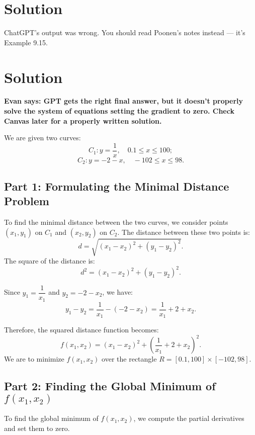 \documentclass[11pt]{article}
\begin{document}
\newpage



\newpage

\section{Solution}
ChatGPT's output was wrong.
You should read Poonen's notes instead --- it's Example 9.15.

\section{Solution}
\textbf{Evan says: GPT gets the right final answer,
but it doesn't properly solve the system of equations setting the gradient to zero.
Check Canvas later for a properly written solution.}

We are given two curves:
\[
C_1: y = \frac{1}{x}, \quad 0.1 \leq x \leq 100;
\]
\[
C_2: y = -2 - x, \quad -102 \leq x \leq 98.
\]

\subsection{Part 1: Formulating the Minimal Distance Problem}

To find the minimal distance between the two curves, we consider points \( (x_1, y_1) \) on \( C_1 \) and \( (x_2, y_2) \) on \( C_2 \). The distance between these two points is:
\[
d = \sqrt{(x_1 - x_2)^2 + (y_1 - y_2)^2}.
\]
The square of the distance is:
\[
d^2 = (x_1 - x_2)^2 + (y_1 - y_2)^2.
\]

Since \( y_1 = \dfrac{1}{x_1} \) and \( y_2 = -2 - x_2 \), we have:
\[
y_1 - y_2 = \frac{1}{x_1} - (-2 - x_2) = \frac{1}{x_1} + 2 + x_2.
\]

Therefore, the squared distance function becomes:
\[
f(x_1, x_2) = (x_1 - x_2)^2 + \left( \frac{1}{x_1} + 2 + x_2 \right)^2.
\]
We are to minimize \( f(x_1, x_2) \) over the rectangle \( R = [0.1, 100] \times [-102, 98] \).

\newpage

\subsection{Part 2: Finding the Global Minimum of \( f(x_1, x_2) \)}

To find the global minimum of \( f(x_1, x_2) \), we compute the partial derivatives and set them to zero.

\newpage
\end{document}
